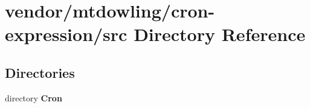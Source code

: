 \section{vendor/mtdowling/cron-\/expression/src Directory Reference}
\label{dir_5a51d1c32deced3135a185d577ae296a}
\subsection*{Directories}
\begin{DoxyCompactItemize}
\item 
directory {\bf Cron}
\end{DoxyCompactItemize}
